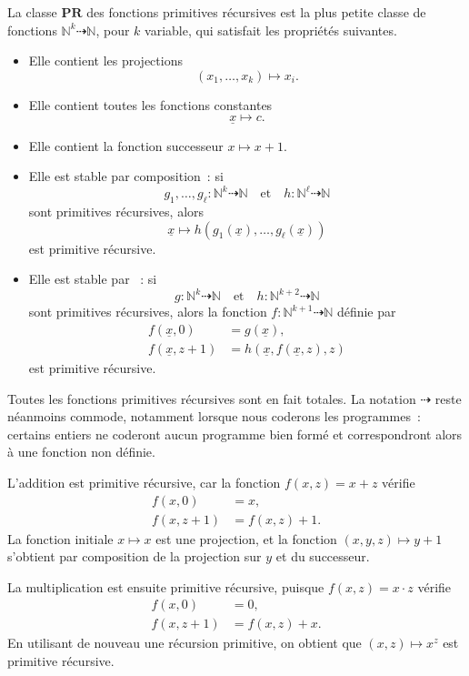 \begin{defn}\label{primitive-recursive-definition}
La classe $\mathbf{PR}$ des fonctions primitives récursives est la plus
petite classe de fonctions
$\mathbb{N}^k\dasharrow\mathbb{N}$, pour $k$ variable, qui satisfait
les propriétés suivantes.
\begin{itemize}
\item Elle contient les projections
\[
(x_1,\ldots,x_k)\mapsto x_i.
\]
\item Elle contient toutes les fonctions constantes
\[
\underline{x}\mapsto c.
\]
\item Elle contient la fonction successeur $x\mapsto x+1$.
\item Elle est stable par composition : si
\[
g_1,\ldots,g_\ell\colon\mathbb{N}^k\dasharrow\mathbb{N}
\quad\text{et}\quad
h\colon\mathbb{N}^\ell\dasharrow\mathbb{N}
\]
sont primitives récursives, alors
\[
\underline{x}\mapsto
h(g_1(\underline{x}),\ldots,g_\ell(\underline{x}))
\]
est primitive récursive.
\item Elle est stable par  : si
\[
g\colon\mathbb{N}^k\dasharrow\mathbb{N}
\quad\text{et}\quad
h\colon\mathbb{N}^{k+2}\dasharrow\mathbb{N}
\]
sont primitives récursives, alors la fonction
$f\colon\mathbb{N}^{k+1}\dasharrow\mathbb{N}$ définie par
\[
\begin{aligned}
f(\underline{x},0) &= g(\underline{x}),\\
f(\underline{x},z+1)
 &=h(\underline{x},f(\underline{x},z),z)
\end{aligned}
\]
est primitive récursive.
\end{itemize}
\end{defn}

Toutes les fonctions primitives récursives sont en fait totales.  La
notation $\dasharrow$ reste néanmoins commode, notamment lorsque nous
coderons les programmes : certains entiers ne coderont aucun programme
bien formé et correspondront alors à une fonction non définie.

\thingy L'addition est primitive récursive, car la fonction
$f(x,z)=x+z$ vérifie
\[
\begin{aligned}
f(x,0)&=x,\\
f(x,z+1)&=f(x,z)+1.
\end{aligned}
\]
La fonction initiale $x\mapsto x$ est une projection, et la fonction
$(x,y,z)\mapsto y+1$ s'obtient par composition de la projection sur
$y$ et du successeur.

La multiplication est ensuite primitive récursive, puisque
$f(x,z)=x\cdot z$ vérifie
\[
\begin{aligned}
f(x,0)&=0,\\
f(x,z+1)&=f(x,z)+x.
\end{aligned}
\]
En utilisant de nouveau une récursion primitive, on obtient que
$(x,z)\mapsto x^z$ est primitive récursive.

